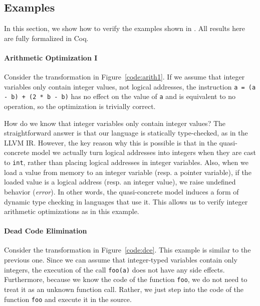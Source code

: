 \subsection{Examples}
\label{sec:intptrcast:compiler-verification:examples}

In this section, we show how to verify the examples shown in .  All
results here are fully formalized in Coq.

\paragraph{Arithmetic Optimization I}

Consider the transformation in Figure~\ref{code:arith1}. If we assume that integer variables only contain integer
values, not logical addresses, the instruction \texttt{a = (a
  - b) + (2 * b - b)} has no effect on the value of \texttt{a} and is equivalent to no
operation, so the optimization is trivially correct. 

How do we know that integer variables only contain
integer values? The straightforward answer is that our language is statically type-checked, as in the LLVM IR. However, the key reason why this is possible
is that in the quasi-concrete model we actually turn logical addresses into integers
when they are cast to \texttt{int}, rather than placing logical addresses in integer
variables. Also, when we load a value from memory to an integer 
variable (resp. a pointer variable), 
if the loaded value is a logical address (resp. an integer value), we raise undefined
behavior (\ie \emph{error}).
In other words, the quasi-concrete model induces a form of dynamic type
checking in languages that use it. This allows us to verify integer
arithmetic optimizations as in this example.

\paragraph{Dead Code Elimination}

Consider the transformation in Figure~\ref{code:dce}.  This example
is similar to the previous one.  Since we can assume that integer-typed
variables contain only integers, the execution of the call
\texttt{foo(a)} does not have any side effects.
Furthermore, because we know the code of the function
\texttt{foo}, we do not need to treat it as an unknown function call.
Rather, we just step into the code of the function \texttt{foo} and
execute it in the source.%

